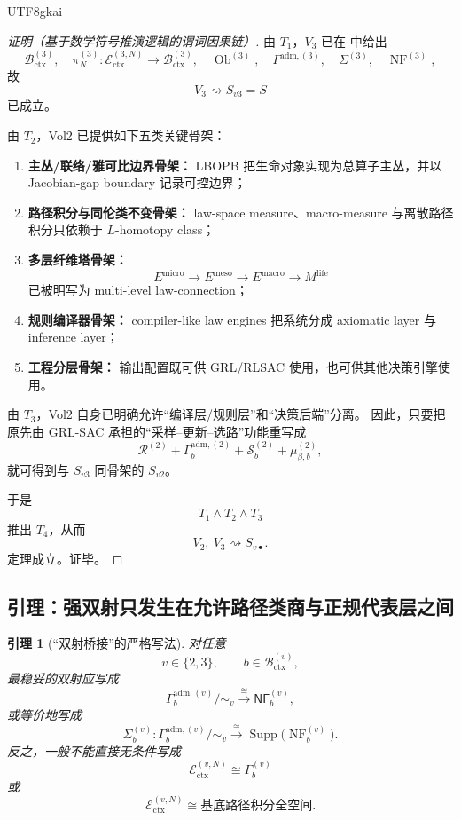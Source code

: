 \documentclass[12pt]{article}
\newtheorem{lemma}{引理}[section]
\newcommand{\Ob}{\operatorname{Ob}}
\newcommand{\NF}{\operatorname{NF}}
\newcommand{\Supp}{\operatorname{Supp}}
\begin{document}
\begin{CJK*}{UTF8}{gkai}
\begin{proof}[证明（基于数学符号推演逻辑的谓词因果链）]
由 $T_1$，$V_3$ 已在 \cite{RepoTex37SemanticGaugeRuntime} 中给出
\[
  \mathcal B_{\mathrm{ctx}}^{(3)},
  \quad
  \pi_N^{(3)}:\mathcal E_{\mathrm{ctx}}^{(3,N)}\to\mathcal B_{\mathrm{ctx}}^{(3)},
  \quad
  \Ob^{(3)},
  \quad
  \Gamma^{\mathrm{adm},(3)},
  \quad
  \Sigma^{(3)},
  \quad
  \NF^{(3)},
\]
故
\[
  V_3\rightsquigarrow S_{v3}=S
\]
已成立。

由 $T_2$，Vol2 已提供如下五类关键骨架：
\begin{enumerate}
  \item \textbf{主丛/联络/雅可比边界骨架：}
  LBOPB 把生命对象实现为总算子主丛，并以 Jacobian-gap boundary 记录可控边界；
  \item \textbf{路径积分与同伦类不变骨架：}
  law-space measure、macro-measure 与离散路径积分只依赖于 $L$-homotopy class；
  \item \textbf{多层纤维塔骨架：}
  \[
    E^{\mathrm{micro}}
    \to
    E^{\mathrm{meso}}
    \to
    E^{\mathrm{macro}}
    \to
    M^{\mathrm{life}}
  \]
  已被明写为 multi-level law-connection；
  \item \textbf{规则编译器骨架：}
  compiler-like law engines 把系统分成 axiomatic layer 与 inference layer；
  \item \textbf{工程分层骨架：}
  输出配置既可供 GRL/RLSAC 使用，也可供其他决策引擎使用。
\end{enumerate}

由 $T_3$，Vol2 自身已明确允许“编译层/规则层”和“决策后端”分离。
因此，只要把原先由 GRL-SAC 承担的“采样--更新--选路”功能重写成
\[
  \mathcal R^{(2)}
  +
  \Gamma_b^{\mathrm{adm},(2)}
  +
  \mathcal S_b^{(2)}
  +
  \mu_{\beta,b}^{(2)},
\]
就可得到与 $S_{v3}$ 同骨架的 $S_{v2}$。

于是
\[
  T_1\wedge T_2\wedge T_3
\]
推出 $T_4$，从而
\[
  V_2,\ V_3
  \rightsquigarrow
  S_{v\bullet}.
\]
定理成立。证毕。
\end{proof}

\subsection{引理：强双射只发生在允许路径类商与正规代表层之间}
\label{subsec:tex39-ch1-lemma}

\begin{lemma}[“双射桥接”的严格写法]
\label{lem:tex39-bijection}
对任意
\[
  v\in\{2,3\},
  \qquad
  b\in\mathcal B_{\mathrm{ctx}}^{(v)},
\]
最稳妥的双射应写成
\[
  \Gamma_b^{\mathrm{adm},(v)}/\!\sim_v
  \xrightarrow{\ \cong\ }
  \mathsf{NF}_b^{(v)},
\]
或等价地写成
\[
  \Sigma_b^{(v)}:
  \Gamma_b^{\mathrm{adm},(v)}/\!\sim_v
  \xrightarrow{\ \cong\ }
  \Supp\bigl(\NF_b^{(v)}\bigr).
\]
反之，一般不能直接无条件写成
\[
  \mathcal E_{\mathrm{ctx}}^{(v,N)}
  \cong
  \Gamma_b^{(v)}
\]
或
\[
  \mathcal E_{\mathrm{ctx}}^{(v,N)}
  \cong
  \text{基底路径积分全空间}.
\]
\end{lemma}


\end{CJK*}
\end{document}
